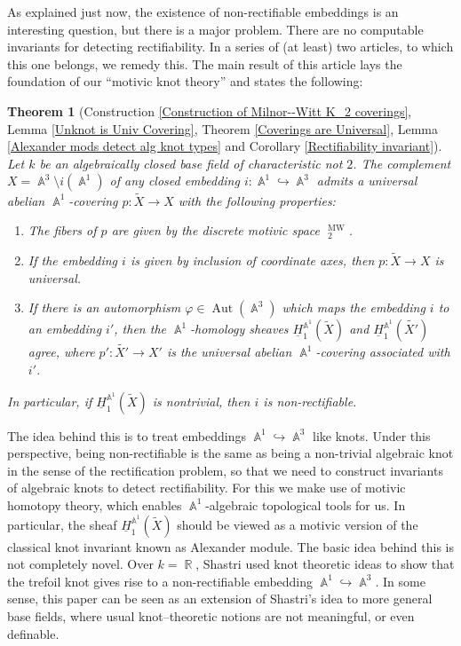 \documentclass[english]{amsart}
\newtheorem*{thm*}{Theorem}
\theoremstyle{definition}
\DeclareMathOperator{\R}{\mathbb{R}}
\DeclareMathOperator{\A}{\mathbb{A}}
\DeclareMathOperator{\Aut}{Aut}
\DeclareMathOperator{\KK}{\underline{K}}
\DeclareMathOperator{\MW}{MW}
\begin{document}
As explained just now, the existence of non-rectifiable embeddings is an interesting question, but there is a major problem. There are no computable invariants for detecting rectifiability. In a series of (at least) two articles, to which this one belongs, we remedy this. The main result of this article lays the foundation of our ``motivic knot theory'' and states the following: 
\begin{thm*}[Construction \ref{Construction of Milnor--Witt K_2 coverings}, Lemma \ref{Unknot is Univ Covering}, Theorem \ref{Coverings are Universal}, Lemma \ref{Alexander mods detect alg knot types} and Corollary \ref{Rectifiability invariant}]
Let $k$ be an algebraically closed base field of characteristic not $2$. The complement $X = \A^3 \setminus i(\A^1)$ of any closed embedding $i \colon \A^1 \hookrightarrow \A^3$ admits a universal abelian $\A^1$-covering $p \colon \widetilde{X} \rightarrow X$ with the following properties:
\begin{enumerate}
\item[(i)] The fibers of $p$ are given by the discrete motivic space $\KK^{\MW}_2$.
\item[(ii)] If the embedding $i$ is given by inclusion of coordinate axes, then $p \colon \widetilde{X} \rightarrow X$ is universal.
\item[(iii)] If there is an automorphism $\varphi \in \Aut(\A^3)$ which maps the embedding $i$ to an embedding $i'$, then the $\A^1$-homology sheaves $\underline{H}_1^{\A^1}\!(\widetilde{X})$ and  $\underline{H}_1^{\A^1}(\widetilde{X'})$ agree, where $p' \colon \widetilde{X'} \rightarrow X'$ is the universal abelian $\A^1$-covering associated with $i'$.
\end{enumerate}
In particular, if $\underline{H}_1^{\A^1}\!(\widetilde{X})$ is nontrivial, then $i$ is non-rectifiable.
\end{thm*}
The idea behind this is to treat embeddings $\A^1 \hookrightarrow \A^3$ like knots. Under this perspective, being non-rectifiable is the same as being a non-trivial algebraic knot in the sense of the rectification problem, so that we need to construct invariants of algebraic knots to detect rectifiability. For this we make use of motivic homotopy theory, which enables $\A^1$-algebraic topological tools for us. In particular, the sheaf $\underline{H}_1^{\A^1}\!(\widetilde{X})$ should be viewed as a motivic version of the classical knot invariant known as Alexander module. The basic idea behind this is not completely novel. Over $k = \R$, Shastri \cite{MR1145717} used knot theoretic ideas to show that the trefoil knot gives rise to a non-rectifiable embedding $\A^1 \hookrightarrow \A^3$. In some sense, this paper can be seen as an extension of Shastri's idea to more general base fields, where usual knot--theoretic notions are not meaningful, or even definable.
\end{document}
